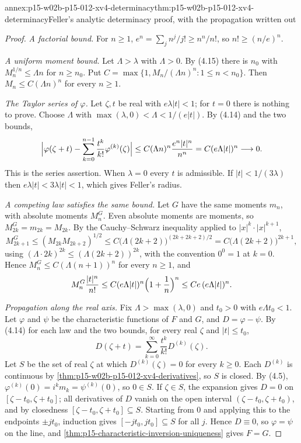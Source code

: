 \begin{annexitem}{annex:p15-w02b-p15-012-xv4-determinacy}{thm:p15-w02b-p15-012-xv4-determinacy}{Feller's analytic determinacy proof, with the propagation written out}
\begin{proof}
\emph{A factorial bound.} For \(n\geq1\),
\(e^n=\sum_jn^j/j!\geq n^n/n!\), so \(n!\geq(n/e)^n\).

\emph{A uniform moment bound.} Let \(\Lambda>\lambda\) with \(\Lambda>0\).
By (4.15) there is \(n_0\) with \(M_n^{1/n}\leq\Lambda n\) for \(n\geq n_0\).
Put \(C=\max\{1,M_n/(\Lambda n)^n:1\leq n<n_0\}\). Then
\(M_n\leq C(\Lambda n)^n\) for every \(n\geq1\).

\emph{The Taylor series of \(\varphi\).} Let \(\zeta,t\) be real with
\(e\lambda|t|<1\); for \(t=0\) there is nothing to prove. Choose
\(\Lambda\) with \(\max(\lambda,0)<\Lambda<1/(e|t|)\). By (4.14) and the two
bounds,
\[
 \Bigl|\varphi(\zeta+t)-\sum_{k=0}^{n-1}\frac{t^k}{k!}\varphi^{(k)}(\zeta)\Bigr|
   \leq C(\Lambda n)^n\frac{e^n|t|^n}{n^n}=C(e\Lambda|t|)^n\longrightarrow0 .
\]
This is the series assertion. When \(\lambda=0\) every \(t\) is admissible.
If \(|t|<1/(3\lambda)\) then \(e\lambda|t|<3\lambda|t|<1\), which gives
Feller's radius.

\emph{A competing law satisfies the same bound.} Let \(G\) have the same
moments \(m_n\), with absolute moments \(M_n^G\). Even absolute moments are
moments, so \(M_{2k}^G=m_{2k}=M_{2k}\). By the Cauchy--Schwarz inequality
applied to \(|x|^k\cdot|x|^{k+1}\),
\[
 M_{2k+1}^G\leq(M_{2k}M_{2k+2})^{1/2}
   \leq C\bigl(\Lambda(2k+2)\bigr)^{(2k+2k+2)/2}=C\bigl(\Lambda(2k+2)\bigr)^{2k+1},
\]
using \((\Lambda\cdot2k)^{2k}\leq(\Lambda(2k+2))^{2k}\), with the convention
\(0^0=1\) at \(k=0\). Hence \(M_n^G\leq C(\Lambda(n+1))^n\) for every
\(n\geq1\), and
\[
 M_n^G\frac{|t|^n}{n!}\leq C(e\Lambda|t|)^n\Bigl(1+\frac1n\Bigr)^n
   \leq Ce\,(e\Lambda|t|)^n .
\]

\emph{Propagation along the real axis.} Fix \(\Lambda>\max(\lambda,0)\) and
\(t_0>0\) with \(e\Lambda t_0<1\). Let \(\varphi\) and \(\psi\) be the
characteristic functions of \(F\) and \(G\), and \(D=\varphi-\psi\). By
(4.14) for each law and the two bounds, for every real \(\zeta\) and
\(|t|\leq t_0\),
\[
 D(\zeta+t)=\sum_{k=0}^\infty\frac{t^k}{k!}D^{(k)}(\zeta).
\]
Let \(S\) be the set of real \(\zeta\) at which \(D^{(k)}(\zeta)=0\) for every
\(k\geq0\). Each \(D^{(k)}\) is continuous by
\cref{thm:p15-w02b-p15-012-xv4-derivatives}, so \(S\) is closed. By (4.5),
\(\varphi^{(k)}(0)=i^km_k=\psi^{(k)}(0)\), so \(0\in S\). If \(\zeta\in S\),
the expansion gives \(D=0\) on \([\zeta-t_0,\zeta+t_0]\); all derivatives of
\(D\) vanish on the open interval \((\zeta-t_0,\zeta+t_0)\), and by closedness
\([\zeta-t_0,\zeta+t_0]\subseteq S\). Starting from \(0\) and applying this to
the endpoints \(\pm jt_0\), induction gives \([-jt_0,jt_0]\subseteq S\) for all
\(j\). Hence \(D\equiv0\), so \(\varphi=\psi\) on the line, and
\cref{thm:p15-characteristic-inversion-uniqueness} gives \(F=G\).
\end{proof}
\end{annexitem}


